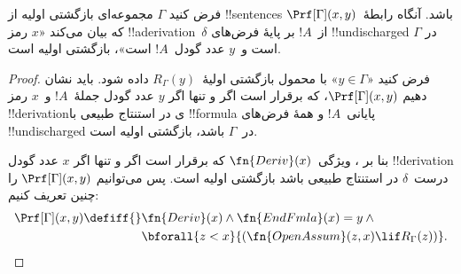 \documentclass[../../../include/open-logic-section]{subfiles}
\begin{document}
\begin{prop}
  فرض کنید $\Gamma$ مجموعه‌ای بازگشتی اولیه از !!{sentence}s باشد. آنگاه
  رابطهٔ~$\Prf[\Gamma](x,y)$ که بیان می‌کند «$x$ رمز
  !!a{derivation}~$\delta$ از~$!A$ بر پایهٔ فرض‌های !!{undischarged} در
  $\Gamma$ است و~$y$ عدد گودل~$!A$ است»، بازگشتی اولیه است.
\end{prop}

\begin{proof}
  فرض کنید «$y\in\Gamma$» با محمول بازگشتی اولیهٔ~$R_\Gamma(y)$ داده
  شود. باید نشان دهیم $\Prf[\Gamma](x,y)$، که برقرار است اگر و تنها
  اگر $y$ عدد گودل جملهٔ~$!A$ و~$x$ رمز !!{derivation}ی در استنتاج طبیعی
  با !!{formula} پایانی~$!A$ و همهٔ فرض‌های !!{undischarged} در~$\Gamma$
  باشد، بازگشتی اولیه است.

  بنا بر ، ویژگی~$\fn{Deriv}(x)$ که برقرار است اگر
  و تنها اگر $x$ عدد گودل !!{derivation} درست~$\delta$ در استنتاج طبیعی
  باشد بازگشتی اولیه است. پس می‌توانیم $\Prf[\Gamma](x,y)$ را چنین
  تعریف کنیم:
  \begin{align*}
    \Prf[\Gamma](x, y) \defiff {}
    & \fn{Deriv}(x) \land \fn{EndFmla}(x) = y \land {} \\
    & \bforall{z < x}{(\fn{OpenAssum}(z, x) \lif R_\Gamma(z))}.
  \end{align*}
\end{proof}
\end{document}
